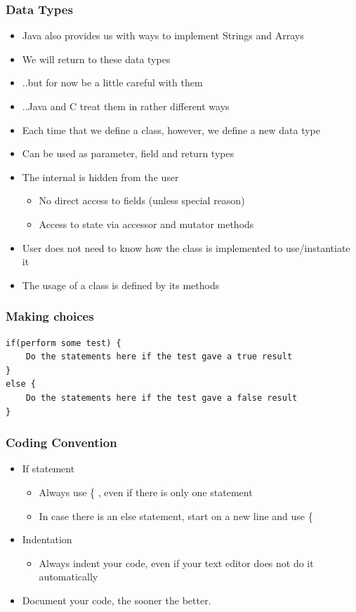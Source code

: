 \documentclass{beamer}
\begin{document}
\begin{frame}
\frametitle{Data Types}
\begin{itemize}
\item Java also provides us with ways to implement Strings and Arrays
\item We will return to these data types
\item ..but for now be a little careful with them
\item ..Java and C treat them in rather different ways
\end{itemize} 
\end{frame}

\begin{frame}
\begin{itemize}
\item Each time that we define a class, however, we define a new data type
\item Can be used as parameter, field and return types
\item The internal is hidden from the user
\begin{itemize}
\item No direct access to fields (unless special reason)‏
\item Access to state via accessor and mutator methods
\end{itemize}
\item User does not need to know how the class is implemented to use/instantiate it
\item The usage of a class is defined by its methods
\end{itemize}
\end{frame}

\begin{frame}[fragile]
\frametitle{Making choices}
\small
\begin{lstlisting}
if(perform some test) {
    Do the statements here if the test gave a true result
}
else {
    Do the statements here if the test gave a false result
} 
\end{lstlisting}
\end{frame}

\begin{frame}
\frametitle{Coding Convention}
\begin{itemize}
\item If statement
\begin{itemize}
\item Always use \{ , even if there is only one statement
\item In case there is an else statement, start on a new line and use \{
\end{itemize}
\item Indentation
\begin{itemize}
\item Always indent your code, even if your text editor does not do it automatically
\end{itemize}
\item Document your code, the sooner the better. 
\end{itemize}
\end{frame}
\end{document}
